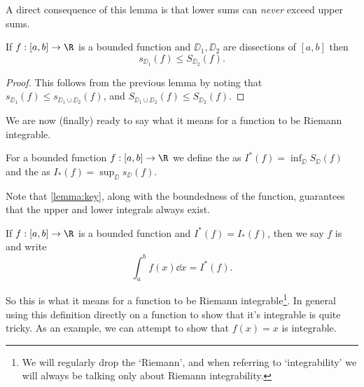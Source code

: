 \documentclass[a4paper]{scrartcl}
\begin{document}
A direct consequence of this lemma is that lower sums can \emph{never} exceed upper sums.

\begin{lemma}\label{lemma:key}
	If $f: [a, b] \rightarrow \R$ is a bounded function and $\DD_1, \DD_2$ are dissections of $[a, b]$ then
	$$
s_{\DD_1}(f) \leq S_{\DD_2}(f).
	$$
\end{lemma}
\begin{proof}
	This follows from the previous lemma by noting that $s_{\DD_1}(f) \leq s_{\DD_1 \cup \DD_2}(f)$, and $S_{\DD_1 \cup \DD_2}(f) \leq S_{\DD_2} (f)$.
\end{proof}

We are now (finally) ready to say what it means for a function to be Riemann integrable.

\begin{definition}
	For a bounded function $f:[a, b] \rightarrow \R$ we define the  as $I^*(f) = \inf_{\DD} S_\DD(f)$ and the  as $I_*(f) = \sup_{\DD} s_\DD(f)$. 
\end{definition}

Note that \autoref{lemma:key}, along with the boundedness of the function, guarantees that the upper and lower integrals always exist.

\begin{definition}
	If $f:[a, b] \rightarrow \R$ is a bounded function and $I^*(f) = I_*(f)$, then we say $f$ is  and write
	$$
	\int_a^b f(x)\dd x = I^*(f).
	$$
\end{definition}

So this is what it means for a function to be Riemann integrable\footnote{We will regularly drop the `Riemann', and when referring to `integrability' we will always be talking only about Riemann integrability.}. In general using this definition directly on a function to show that it's integrable is quite tricky. As an example, we can attempt to show that $f(x) = x$ is integrable.
\end{document}
